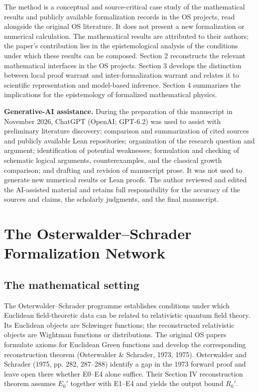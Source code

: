 \documentclass[pdflatex,sn-apa]{sn-jnl}
\begin{document}
The method is a conceptual and source-critical case study of the mathematical results and publicly available formalization records in the OS projects, read alongside the original OS literature. It does not present a new formalization or numerical calculation. The mathematical results are attributed to their authors; the paper's contribution lies in the epistemological analysis of the conditions under which these results can be composed. Section 2 reconstructs the relevant mathematical interfaces in the OS projects. Section 3 develops the distinction between local proof warrant and inter-formalization warrant and relates it to scientific representation and model-based inference. Section 4 summarizes the implications for the epistemology of formalized mathematical physics.

\noindent\textbf{Generative-AI assistance.} During the preparation of this manuscript in November 2026, ChatGPT (OpenAI; GPT-6.2) was used to assist with preliminary literature discovery; comparison and summarization of cited sources and publicly available Lean repositories; organization of the research question and argument; identification of potential weaknesses; formulation and checking of schematic logical arguments, counterexamples, and the classical growth comparison; and drafting and revision of manuscript prose. It was not used to generate new numerical results or Lean proofs. The author reviewed and edited the AI-assisted material and retains full responsibility for the accuracy of the sources and claims, the scholarly judgments, and the final manuscript.

\section{The Osterwalder--Schrader Formalization Network}

\subsection{The mathematical setting}

The Osterwalder--Schrader programme establishes conditions under which Euclidean field-theoretic data can be related to relativistic quantum field theory. Its Euclidean objects are Schwinger functions; the reconstructed relativistic objects are Wightman functions or distributions. The original OS papers formulate axioms for Euclidean Green functions and develop the corresponding reconstruction theorem (Osterwalder \& Schrader, 1973, 1975). Osterwalder and Schrader (1975, pp. 282, 287--288) identify a gap in the 1973 forward proof and leave open there whether E0--E4 alone suffice. Their Section IV reconstruction theorem assumes \(E_0'\) together with E1--E4 and yields the output bound \(R_0'\).
\end{document}
